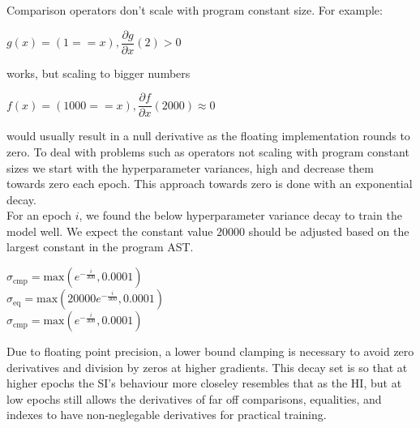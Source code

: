 \documentclass{article}
\begin{document}
Comparison operators don't scale with program constant size. For example:
\begin{center}
  $g(x) = (1 == x), \dfrac{\partial g}{\partial x} (2) > 0$
\end{center}
works, but scaling to bigger numbers
\begin{center}
  $f(x) = (1000 == x), \dfrac{\partial f}{\partial x} (2000) \approx 0$\\
\end{center}
would usually result in a null derivative as the floating implementation rounds to zero. To deal with problems such as operators not scaling with program constant sizes we start with the hyperparameter variances, high and decrease them towards zero each epoch. This approach towards zero is done with an exponential decay.\\

For an epoch $i$, we found the below hyperparameter variance decay to train the model well. We expect the constant value $20000$ should be adjusted based on the largest constant in the program AST.
\begin{center}
  $\sigma_{\text{cmp}} = \text{max}(e^{-\frac{i}{300}}, 0.0001)$\\
  $\sigma_{\text{eq}} = \text{max}(20000e^{-\frac{i}{300}}, 0.0001)$\\
  $\sigma_{\text{cmp}} = \text{max}(e^{-\frac{i}{300}}, 0.0001)$\\
\end{center}
Due to floating point precision, a lower bound clamping is necessary to avoid zero derivatives and division by zeros at higher gradients. This decay set is so that at higher epochs the SI's behaviour more closeley resembles that as the HI, but at low epochs still allows the derivatives of far off comparisons, equalities, and indexes to have non-neglegable derivatives for practical training. 
\end{document}
